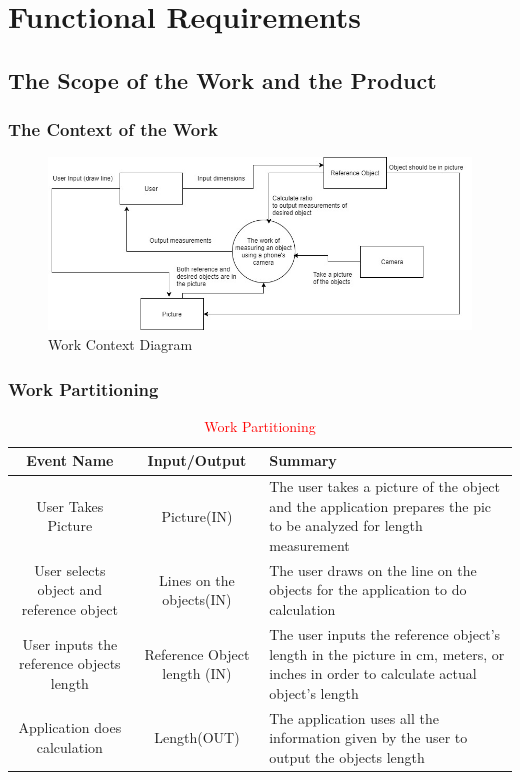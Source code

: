 \documentclass[12pt, titlepage]{article}
\begin{document}
\section{Functional Requirements}

\subsection{The Scope of the Work and the Product}

\subsubsection{The Context of the Work}
\begin{figure}[H]
   \centering
   \includegraphics[width=6in]{work.jpg} 
   \caption{Work Context Diagram}
   \label{fig:1}
\end{figure}

\subsubsection{Work Partitioning}
	\begin{table}[H]

	\begin{tabular}{|c|c|L|}
		\hline
		\hline
		Event Name & Input/Output & Summary\\
		\hline
		User Takes Picture & Picture(IN) & The user takes a picture of the object and the application prepares the pic to be analyzed for length measurement\\
		\hline
		User selects object and reference object& Lines on the objects(IN) & The user draws on the line on the objects for the application to do calculation \\ 
		\hline 
		User inputs the reference objects length & 
		Reference Object length (IN) & The user inputs the reference object's length in the picture in cm, meters, or inches in order to calculate actual object's length \\
		\hline
		Application does calculation & Length(OUT) & The application uses all the information given by the user to output the objects length \\ 
		\hline
		\hline
	\end{tabular}
		\caption{\textcolor{red}{Work Partitioning}}
		\label{table:2}
\end{table}
\end{document}
